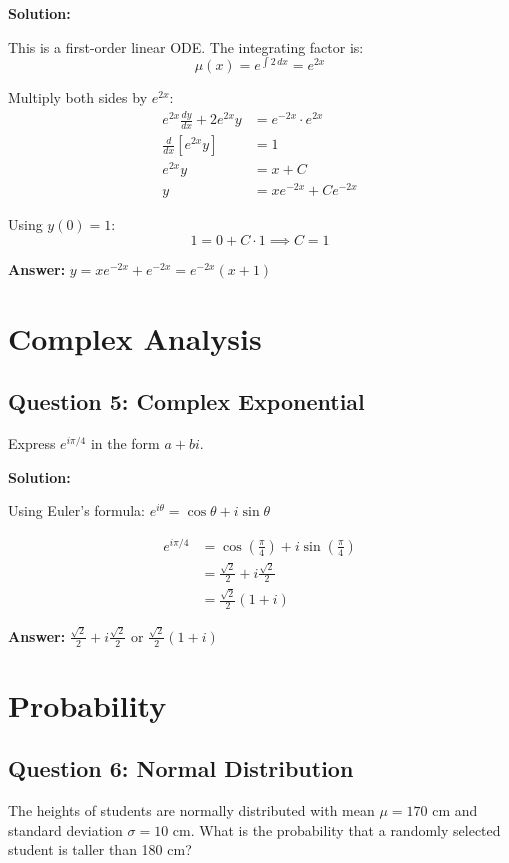 \documentclass[12pt]{article}
\begin{document}
\textbf{Solution:}

This is a first-order linear ODE. The integrating factor is:
$$\mu(x) = e^{\int 2 \, dx} = e^{2x}$$

Multiply both sides by $e^{2x}$:
\begin{align*}
    e^{2x}\frac{dy}{dx} + 2e^{2x}y &= e^{-2x} \cdot e^{2x} \\
    \frac{d}{dx}[e^{2x}y] &= 1 \\
    e^{2x}y &= x + C \\
    y &= xe^{-2x} + Ce^{-2x}
\end{align*}

Using $y(0) = 1$:
$$1 = 0 + C \cdot 1 \implies C = 1$$

\textbf{Answer:} $\boxed{y = xe^{-2x} + e^{-2x} = e^{-2x}(x + 1)}$

\section{Complex Analysis}

\subsection*{Question 5: Complex Exponential}
Express $e^{i\pi/4}$ in the form $a + bi$.

\textbf{Solution:}

Using Euler's formula: $e^{i\theta} = \cos\theta + i\sin\theta$

\begin{align*}
    e^{i\pi/4} &= \cos\left(\frac{\pi}{4}\right) + i\sin\left(\frac{\pi}{4}\right) \\
    &= \frac{\sqrt{2}}{2} + i\frac{\sqrt{2}}{2} \\
    &= \frac{\sqrt{2}}{2}(1 + i)
\end{align*}

\textbf{Answer:} $\boxed{\frac{\sqrt{2}}{2} + i\frac{\sqrt{2}}{2}}$ or $\boxed{\frac{\sqrt{2}}{2}(1 + i)}$

\section{Probability}

\subsection*{Question 6: Normal Distribution}
The heights of students are normally distributed with mean $\mu = 170$ cm and standard deviation $\sigma = 10$ cm. What is the probability that a randomly selected student is taller than 180 cm?
\end{document}
